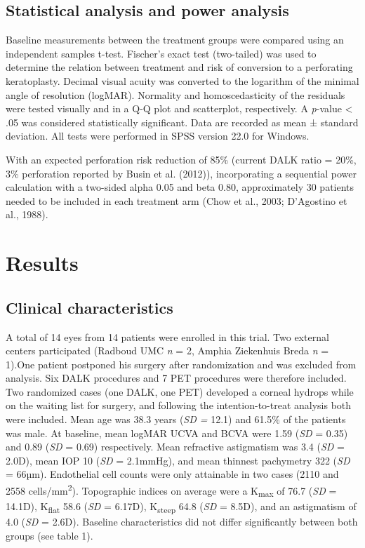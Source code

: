 \documentclass[authordate, empirical,issue]{jote-new-article}
\begin{document}
	\subsection{Statistical analysis and power analysis}



	Baseline measurements between the treatment groups were compared using an independent samples t-test. Fischer's exact test (two-tailed) was used to determine the relation between treatment and risk of conversion to a perforating keratoplasty. Decimal visual acuity was converted to the logarithm of the minimal angle of resolution (logMAR). Normality and homoscedasticity of the residuals were tested visually and in a Q-Q plot and scatterplot, respectively. A \emph{p}-value < .05 was considered statistically significant. Data are recorded as mean ± standard deviation. All tests were performed in SPSS version 22.0 for Windows.



	With an expected perforation risk reduction of 85\% (current DALK ratio = 20\%, 3\% perforation reported by Busin et al. (2012)), incorporating a sequential power calculation with a two-sided alpha 0.05 and beta 0.80, approximately 30 patients needed to be included in each treatment arm\textsuperscript{ }(Chow et al., 2003; D'Agostino et al., 1988).



	\section{Results}

	\subsection{Clinical characteristics}



	A total of 14 eyes from 14 patients were enrolled in this trial. Two external centers participated (Radboud UMC \emph{n }= 2, Amphia Ziekenhuis Breda \emph{n} = 1).One patient postponed his surgery after randomization and was excluded from analysis. Six DALK procedures and 7 PET procedures were therefore included. Two randomized cases (one DALK, one PET) developed a corneal hydrops while on the waiting list for surgery, and following the intention-to-treat analysis both were included. Mean age was 38.3 years (\emph{SD =} 12.1) and 61.5\% of the patients was male. At baseline, mean logMAR UCVA and BCVA were 1.59 (\emph{SD }=\emph{ }0.35) and 0.89 (\emph{SD }=\emph{ }0.69) respectively. Mean refractive astigmatism was 3.4 (\emph{SD }=\emph{ }2.0D), mean IOP 10 (\emph{SD }=\emph{ }2.1mmHg), and mean thinnest pachymetry 322 (\emph{SD }=\emph{ }66µm). Endothelial cell counts were only attainable in two cases (2110 and 2558 cells/mm\textsuperscript{2}). Topographic indices on average were a K\textsubscript{max} of 76.7 (\emph{SD }=\emph{ }14.1D), K\textsubscript{flat} 58.6 (\emph{SD }=\emph{ }6.17D), K\textsubscript{steep} 64.8 (\emph{SD }=\emph{ }8.5D), and an astigmatism of 4.0 (\emph{SD }=\emph{ }2.6D). Baseline characteristics did not differ significantly between both groups (see table 1).
	
\end{document}
